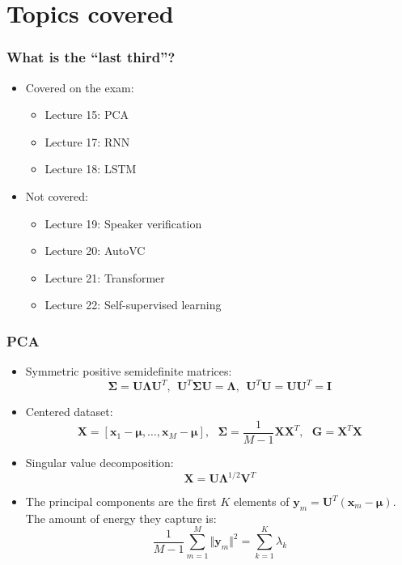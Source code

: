 \documentclass{beamer}
\begin{document}
\section[Topics covered]{Topics covered}
\setcounter{subsection}{1}

\begin{frame}
  \frametitle{What is the ``last third''?}

  \begin{itemize}
  \item Covered on the exam:
    \begin{itemize}
    \item Lecture 15: PCA
    \item Lecture 17: RNN
    \item Lecture 18: LSTM
    \end{itemize}
  \item Not covered:
    \begin{itemize}
    \item Lecture 19: Speaker verification
    \item Lecture 20: AutoVC
    \item Lecture 21: Transformer
    \item Lecture 22: Self-supervised learning
    \end{itemize}
  \end{itemize}
\end{frame}

\begin{frame}
  \frametitle{PCA}
  \begin{itemize}
  \item Symmetric positive semidefinite matrices:
    \[
    \bm{\Sigma}=\bm{U}\bm{\Lambda} \bm{U}^T,~~\bm{U}^T\bm{\Sigma}\bm{U}=\bm{\Lambda},~~\bm{U}^T\bm{U}=\bm{U}\bm{U}^T=\bm{I}
    \]
  \item Centered dataset:
    \[
    \bm{X} = \left[\bm{x}_1-\bm{\mu},\ldots,\bm{x}_{M}-\bm{\mu}\right],~~~
    \bm{\Sigma}=\frac{1}{M-1}\bm{X}\bm{X}^T,~~~
    \bm{G}=\bm{X}^T\bm{X}
    \]
  \item Singular value decomposition:
    \[
    \bm{X} = \bm{U}\bm{\Lambda}^{1/2}\bm{V}^T
    \]
  \item The principal components are the first $K$ elements of
    $\bm{y}_m=\bm{U}^T(\bm{x}_m-\bm{\mu})$.  The amount of energy they capture is:
    \begin{displaymath}
      \frac{1}{M-1}\sum_{m=1}^M\Vert\bm{y}_m\Vert^2=\sum_{k=1}^K \lambda_k
    \end{displaymath}
  \end{itemize}
\end{frame}
\end{document}
